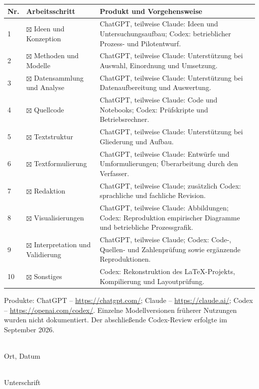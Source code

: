 \small
\begin{longtable}{@{}p{}p{}p{}@{}}
\toprule Nr. & Arbeitsschritt & Produkt und Vorgehensweise\\\midrule
1 & $\boxtimes$ Ideen und Konzeption & ChatGPT, teilweise Claude: Ideen und Untersuchungsaufbau; Codex: betrieblicher Prozess- und Pilotentwurf.\\
2 & $\boxtimes$ Methoden und Modelle & ChatGPT, teilweise Claude: Unterstützung bei Auswahl, Einordnung und Umsetzung.\\
3 & $\boxtimes$ Datensammlung und Analyse & ChatGPT, teilweise Claude: Unterstützung bei Datenaufbereitung und Auswertung.\\
4 & $\boxtimes$ Quellcode & ChatGPT, teilweise Claude: Code und Notebooks; Codex: Prüfskripte und Betriebsrechner.\\
5 & $\boxtimes$ Textstruktur & ChatGPT, teilweise Claude: Unterstützung bei Gliederung und Aufbau.\\
6 & $\boxtimes$ Textformulierung & ChatGPT, teilweise Claude: Entwürfe und Umformulierungen; Überarbeitung durch den Verfasser.\\
7 & $\boxtimes$ Redaktion & ChatGPT, teilweise Claude; zusätzlich Codex: sprachliche und fachliche Revision.\\
8 & $\boxtimes$ Visualisierungen & ChatGPT, teilweise Claude: Abbildungen; Codex: Reproduktion empirischer Diagramme und betriebliche Prozessgrafik.\\
9 & $\boxtimes$ Interpretation und Validierung & ChatGPT, teilweise Claude; Codex: Code-, Quellen- und Zahlenprüfung sowie ergänzende Reproduktionen.\\
10 & $\boxtimes$ Sonstiges & Codex: Rekonstruktion des LaTeX-Projekts, Kompilierung und Layoutprüfung.\\\bottomrule
\end{longtable}
\normalsize
Produkte: ChatGPT -- \url{https://chatgpt.com/}; Claude -- \url{https://claude.ai/};
Codex -- \url{https://openai.com/codex/}. Einzelne Modellversionen früherer Nutzungen
wurden nicht dokumentiert. Der abschließende Codex-Review erfolgte im September 2026.

\vspace{.8cm}
\noindent\parbox[t]{.47\textwidth}{\hrulefill\\Ort, Datum}\hfill
\parbox[t]{.47\textwidth}{\hrulefill\\Unterschrift}

